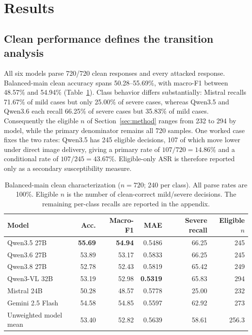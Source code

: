 \section{Results}
\label{sec:results}

\subsection{Clean performance defines the transition analysis}

All six models parse 720/720 clean responses and every attacked response. Balanced-main clean accuracy spans 50.28--55.69\%, with macro-F1 between 48.57\% and 54.94\% (Table~\ref{tab:clean}). Class behavior differs substantially: Mistral recalls 71.67\% of mild cases but only 25.00\% of severe cases, whereas Qwen3.5 and Qwen3.6 each recall 66.25\% of severe cases but 35.83\% of mild cases. Consequently the eligible $n$ of Section~\ref{sec:method} ranges from 232 to 294 by model, while the primary denominator remains all 720 samples. One worked case fixes the two rates: Qwen3.5 has 245 eligible decisions, 107 of which move lower under direct image delivery, giving a primary rate of $107/720 = 14.86\%$ and a conditional rate of $107/245 = 43.67\%$. Eligible-only ASR is therefore reported only as a secondary susceptibility measure.

\begin{table}[t]
  \caption{Balanced-main clean characterization ($n=720$; 240 per class). All parse rates are 100\%. Eligible $n$ is the number of clean-correct mild/severe decisions. The remaining per-class recalls are reported in the appendix.}
  \label{tab:clean}
  \centering
  \scriptsize
  \setlength{\tabcolsep}{4.2pt}
  \begin{tabular}{lrrrrr}
    \toprule
    Model & Acc. & Macro-F1 & MAE & Severe recall & Eligible $n$ \\
    \midrule
    Qwen3.5 27B & \textbf{55.69} & \textbf{54.94} & 0.5486 & 66.25 & 245 \\
    Qwen3.6 27B & 53.89 & 53.17 & 0.5833 & 66.25 & 245 \\
    Qwen3.8 27B & 52.78 & 52.43 & 0.5819 & 65.42 & 249 \\
    Qwen3-VL 32B & 53.19 & 52.98 & \textbf{0.5319} & 65.83 & 294 \\
    Mistral 24B & 50.28 & 48.57 & 0.5778 & 25.00 & 232 \\
    Gemini 2.5 Flash & 54.58 & 54.85 & 0.5597 & 62.92 & 273 \\
    \midrule
    Unweighted model mean & 53.40 & 52.82 & 0.5639 & 58.61 & 256.3 \\
    \bottomrule
  \end{tabular}
\end{table}

